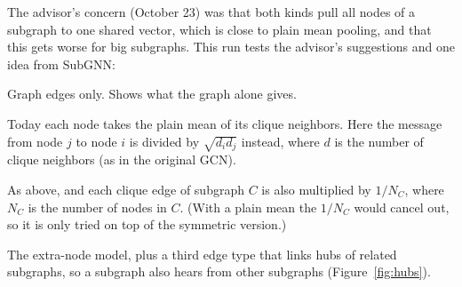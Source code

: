 \documentclass[11pt]{article}
\begin{document}
The advisor's concern (October 23) was that both kinds pull all nodes of a subgraph to one
shared vector, which is close to plain mean pooling, and that this gets worse for big subgraphs.
This run tests the advisor's suggestions and one idea from SubGNN:

\begin{description}[leftmargin=0pt, labelwidth=0pt, itemsep=3pt, font=\normalfont\bfseries]
  \item[No clique.] Graph edges only. Shows what the graph alone gives.
  \item[Clique, symmetric.] Today each node takes the plain mean of its clique neighbors. Here
        the message from node $j$ to node $i$ is divided by $\sqrt{d_i d_j}$ instead, where $d$
        is the number of clique neighbors (as in the original GCN).
  \item[Clique, symmetric $+$ $1/N_C$.] As above, and each clique edge of subgraph $C$ is also
        multiplied by $1/N_C$, where $N_C$ is the number of nodes in $C$. (With a plain mean the
        $1/N_C$ would cancel out, so it is only tried on top of the symmetric version.)
  \item[Hub graph.] The extra-node model, plus a third edge type that links hubs of related
        subgraphs, so a subgraph also hears from other subgraphs (Figure~\ref{fig:hubs}).
\end{description}
\end{document}

